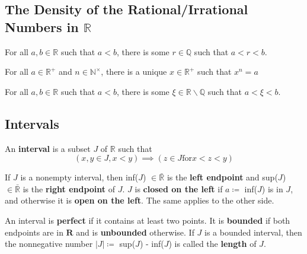 \subsection*{The Density of the Rational/Irrational Numbers in \(\mathbb{R}\)}

\begin{proposition}
    For all \(a, b \in \mathbb{R}\) such that \(a < b\), there is some \(r \in \mathbb{Q}\)
    such that \(a < r < b\). 
\end{proposition}

\begin{proposition}
    For all \(a \in \mathbb{R}^{+}\) and \(n \in \mathbb{N}^\times\), there is a unique
    \(x \in \mathbb{R}^+\) such that \(x^n = a\)
\end{proposition}

\begin{proposition}
    For all \(a, b \in \mathbb{R}\) such that \(a < b\), there is some \(\xi  \in \mathbb{R}\backslash\mathbb{Q}\)
    such that \(a < \xi  < b\).
\end{proposition}

\subsection*{Intervals}

An \textbf{interval} is a subset \(J\) of \(\mathbb{R}\) such that 
\[
    (x, y \in J, x < y) \implies (z \in J \text{for} x < z < y)
\]

If \(J\) is a nonempty interval, then inf(\(J\)) \(\in \bar{\mathbb{R}}\) is the \textbf{left endpoint}
and sup(\(J\)) \(\in \bar{\mathbb{R}}\) is the \textbf{right endpoint} of \(J\). \(J\) is
\textbf{closed on the left} if \(a \coloneqq \) inf(\(J\)) is in \(J\), and otherwise it is 
\textbf{open on the left}. The same applies to the other side.  \par 

An interval is \textbf{perfect} if it contains at least two points. It is \textbf{bounded}
if both endpoints are in \(\textbf{R}\) and is \textbf{unbounded} otherwise. If \(J\) is 
a bounded interval, then the nonnegative number \(\left | J \right | \coloneqq \)
sup(\(J\)) - inf(\(J\)) is called the \textbf{length} of \(J\). 